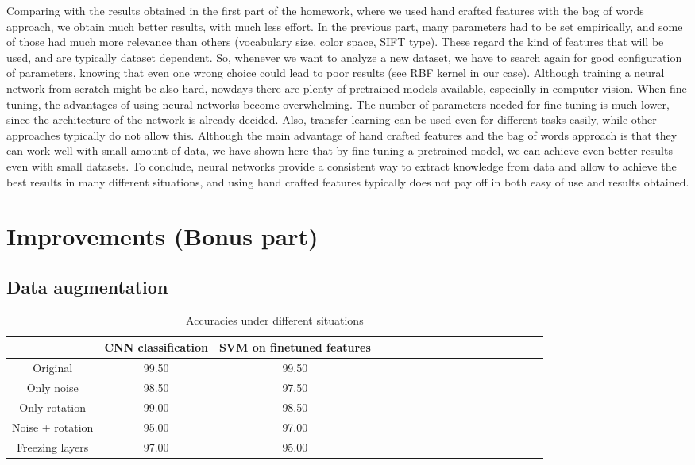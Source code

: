 \documentclass{article}
\begin{document}
Comparing with the results obtained in the first part of the homework, where we used hand crafted features with the bag of words approach, we obtain much better results, with much less effort. In the previous part, many parameters had to be set empirically, and some of those had much more relevance than others (vocabulary size, color space, SIFT type). These regard the kind of features that will be used, and are typically dataset dependent. So, whenever we want to analyze a new dataset, we have to search again for good configuration of parameters, knowing that even one wrong choice could lead to poor results (see RBF kernel in our case). Although training a neural network from scratch might be also hard, nowdays there are plenty of pretrained models available, especially in computer vision. When fine tuning, the advantages of using neural networks become overwhelming. The number of parameters needed for fine tuning is much lower, since the architecture of the network is already decided. Also, transfer learning can be used even for different tasks easily, while other approaches typically do not allow this. Although the main advantage of hand crafted features and the bag of words approach is that they can work well with small amount of data, we have shown here that by fine tuning a pretrained model, we can achieve even better results even with small datasets.
To conclude, neural networks provide a consistent way to extract knowledge from data and allow to achieve the best results in many different situations, and using hand crafted features typically does not pay off in both easy of use and results obtained.

\section{Improvements (Bonus part)}
\subsection{Data augmentation}

\begin{table}
	\centering
	\captionsetup{justification=centering}
	\renewcommand{\arraystretch}{1.5}
	\setlength{\abovecaptionskip}{15pt plus 3pt minus 2pt} %
	\begin{tabular}{|c|c|c|c|c|c|c|c|c|c|c|c|c|c|c|c|c|c|}
		\hline
		& \textbf{CNN classification} & \textbf{SVM on finetuned features}  \\
		\hline
	Original          & 99.50 & 99.50  \\ \hline
	Only noise          & 98.50 & 97.50  \\ \hline
	Only rotation          & 99.00 & 98.50  \\ \hline
	Noise + rotation          & 95.00 & 97.00  \\ \hline
	Freezing layers          & 97.00 & 95.00  \\ \hline

	\end{tabular}
    \caption{Accuracies under different situations}
	\label{tab:res_augment}
\end{table}
\end{document}
